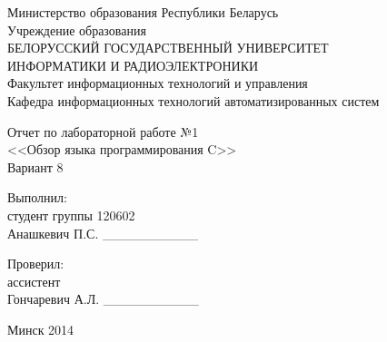 
\thispagestyle{empty}

\begin{center}
  Министерство образования Республики Беларусь \\
  \vspace{0.5ex}
  Учреждение образования \\
  БЕЛОРУССКИЙ ГОСУДАРСТВЕННЫЙ УНИВЕРСИТЕТ \\
  ИНФОРМАТИКИ И РАДИОЭЛЕКТРОНИКИ \\
  \vspace{0.5ex}
  Факультет информационных технологий и управления \\
  \vspace{0.5ex}
  Кафедра информационных технологий автоматизированных систем
\end{center}

\vspace{60mm}

\begin{center}
  Отчет по лабораторной работе №1 \\
  <<Обзор языка программирования C>> \\
  Вариант 8
\end{center}

\vspace{25mm}

\begin{flushleft}

Выполнил: \\
студент группы 120602 \\
Анашкевич П.С. \_\_\_\_\_\_\_\_\_\_

\vspace{0.5ex}

Проверил: \\
ассистент \\
Гончаревич А.Л. \_\_\_\_\_\_\_\_\_\_

\end{flushleft}

\vspace{45mm}
\begin{center}
  Минск 2014
\end{center}

\newpage
